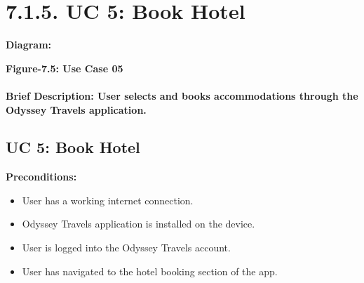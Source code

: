 \documentclass{scrreprt}
\begin{document}
\section*{\textbf{7.1.5. UC 5: Book Hotel}}


\textbf{Diagram:}
\newline
\newline
\begin{center}
    \parbox{0.8\textwidth}{ 
        \centering
    }
\end{center}
\begin{center}
    \parbox{0.8\textwidth}{ 
        \centering
        \textbf{Figure-7.5: Use Case 05}
    }
\end{center}

\paragraph {\textnormal{Brief Description: 
User selects and books accommodations through the Odyssey Travels application.}}


\subsection*{\textbf{UC 5: Book Hotel}}

\textbf{Preconditions:}
\begin{itemize}
    \item User has a working internet connection.
    \item Odyssey Travels application is installed on the device.
    \item User is logged into the Odyssey Travels account.
    \item User has navigated to the hotel booking section of the app.
\end{itemize}
\end{document}
